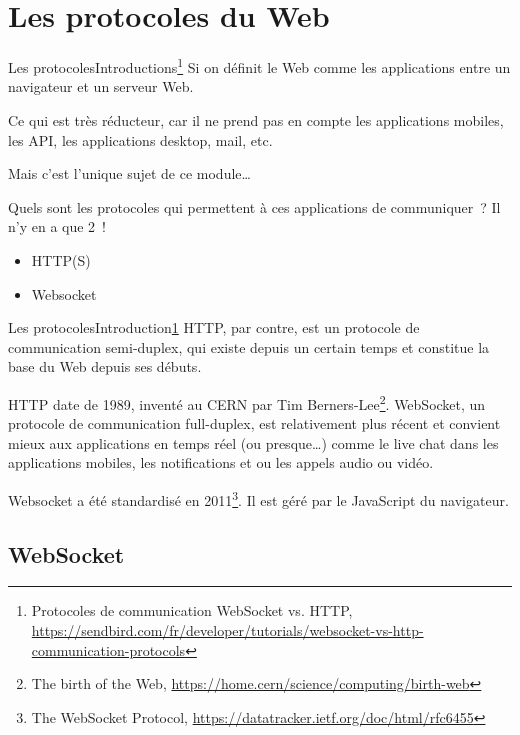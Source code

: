 \documentclass{beamer}
\begin{document}
    \section{Les protocoles du Web}\label{sec:protocoles}

    \begin{frame}{Les protocoles}{Introductions\footnote{\label{sendbird-protocole}Protocoles de communication WebSocket vs. HTTP, \url{https://sendbird.com/fr/developer/tutorials/websocket-vs-http-communication-protocols}}}
        Si on définit le Web comme les applications entre un navigateur et un serveur Web.
        \begin{dangercolorbox}
            Ce qui est très réducteur, car il ne prend pas en compte les applications mobiles, les API, les applications desktop, mail, etc.

            Mais c'est l'unique sujet de ce module\ldots
        \end{dangercolorbox}
        Quels sont les protocoles qui permettent à ces applications de communiquer~?
        \pause
        \bigbreak
        Il n'y en a que 2~!
        \begin{itemize}
            \item HTTP(S)
            \item Websocket
        \end{itemize}
    \end{frame}

    \begin{frame}{Les protocoles}{Introduction\cref{sendbird-protocole}}
        HTTP, par contre, est un protocole de communication semi-duplex, qui existe depuis un certain temps et constitue la base du Web depuis ses débuts.

        HTTP date de 1989, inventé au CERN par Tim Berners-Lee\footnote{The birth of the Web, \url{https://home.cern/science/computing/birth-web}}.
        \bigbreak
        WebSocket, un protocole de communication full-duplex, est relativement plus récent et convient mieux aux applications en temps réel (ou presque\ldots) comme le live chat dans les applications mobiles, les notifications et ou les appels audio ou vidéo.

        Websocket a été standardisé en 2011\footnote{The WebSocket Protocol, \url{https://datatracker.ietf.org/doc/html/rfc6455}}.
        Il est géré par le JavaScript du navigateur.
    \end{frame}

    \subsection{WebSocket}\label{subsec:websocket}
\end{document}
